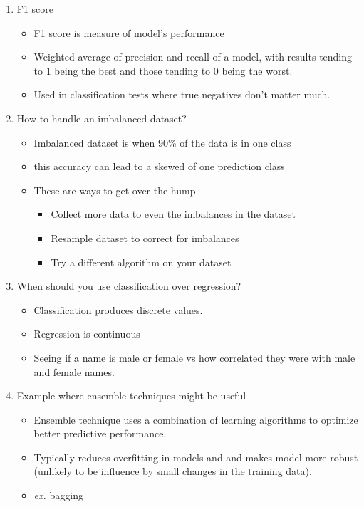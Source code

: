 \documentclass[12pt,a4paper]{article}
\begin{document}
\begin{enumerate}
\begin{itemize}
  \end{itemize}
  \item F1 score
  \begin{itemize}
    \item F1 score is measure of model's performance
    \item Weighted average of precision and recall of a 
          model, with results tending to 1 being the best 
          and those tending to 0 being the worst.
    \item Used in classification tests where true negatives 
          don't matter much. 
  \end{itemize}
  \item How to handle an imbalanced dataset?
  \begin{itemize}
    \item Imbalanced dataset is when 90\% of the data is in one 
          class
    \item this accuracy can lead to a skewed of one prediction class
    \item These are ways to get over the hump
    \begin{itemize}
      \item Collect more data to even the imbalances in the dataset
      \item Resample dataset to correct for imbalances
      \item Try a different algorithm on your dataset
    \end{itemize}
  \end{itemize}
  \item When should you use classification over regression?
  \begin{itemize}
    \item Classification produces discrete values. 
    \item Regression is continuous
    \item Seeing if a name is male or female vs how correlated 
          they were with male and female names.
  \end{itemize}
  \item Example where ensemble techniques might be useful
  \begin{itemize}
    \item Ensemble technique uses a combination of learning 
          algorithms to optimize better predictive performance. 
    \item Typically reduces overfitting in models and and makes model 
          more robust (unlikely to be influence by small changes in 
          the training data).
    \item \textit{ex. } bagging
  \end{itemize}
\end{enumerate}
\noindent\hrulefill
\end{document}
